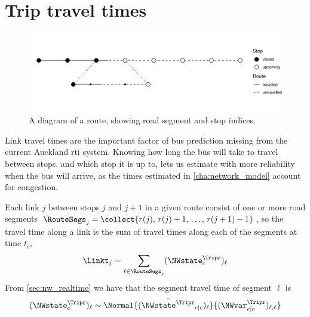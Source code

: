 \section{Trip travel times}
\label{sec:trip_state_link}


\begin{knitrout}\small
{}\color{fgcolor}\begin{figure}
\includegraphics[width=\maxwidth]{figure/trip_segments-1} \caption[A diagram of a route, showing road segment and stop indices]{A diagram of a route, showing road segment and stop indices.}\label{fig:trip_segments}
\end{figure}


\end{knitrout}





Link travel times are the important factor of bus prediction
missing from the current Auckland \gls{rti} system.
Knowing how long the bus will take to travel between stops,
and which stop it is up to,
lets us estimate with more reliability when the bus will arrive,
as the times estimated in \cref{cha:network_model}
account for \rt{} congestion.


Each link $j$ between stops $j$ and $j+1$ in a given route
consist of one or more road segments
$\RouteSegs_j = \collect{r(j),\,r(j)+1,\, \ldots,\, r(j+1) - 1}$,
so the travel time along a link
is the sum of travel times along each of the segments
at time $t_c$,
\begin{equation}
\label{eq:link_tt}
\Linkt_{j} = \sum_{\ell\in\RouteSegs_j} (\NWstate^\Tripr_c)_\ell
\end{equation}
From \cref{sec:nw_realtime} we have that
the segment travel time of segment $\ell$ is
\begin{equation}
\label{eq:seg_tt_dist}
(\NWstate^\Tripr_c)_\ell \sim
\Normal{(\hat{\NWstate^\Tripr}_{c|c})_\ell}%
{(\NWvar^\Tripr_{c|c})_{\ell,\ell}}
\end{equation}

